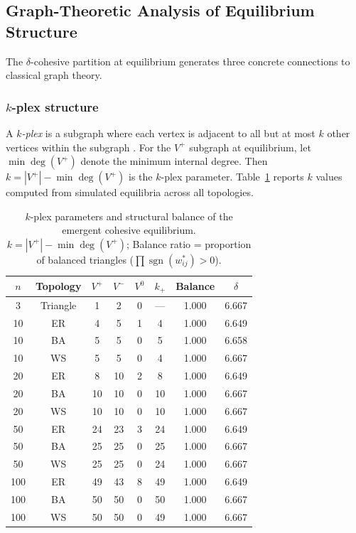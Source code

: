 \documentclass[3p]{elsarticle}
\DeclareMathOperator{\sign}{sgn}
\begin{document}
\subsection{Graph-Theoretic Analysis of Equilibrium Structure}

The $\delta$-cohesive partition at equilibrium generates three concrete connections to classical graph theory.

\subsubsection{$k$-plex structure}

A \emph{$k$-plex} is a subgraph where each vertex is adjacent to all but at most $k$ other vertices within the subgraph \cite{seidman1983network}. For the $V^+$ subgraph at equilibrium, let $\min\deg(V^+)$ denote the minimum internal degree. Then $k = |V^+| - \min\deg(V^+)$ is the $k$-plex parameter. Table~\ref{tab:kplex} reports $k$ values computed from simulated equilibria across all topologies.

\begin{table}[ht]
\centering
\caption{$k$-plex parameters and structural balance of the emergent cohesive equilibrium. $k = |V^+| - \min\deg(V^+)$; Balance ratio = proportion of balanced triangles ($\prod \sign(w_{ij}^*) > 0$).}
\label{tab:kplex}
\begin{tabular}{cccccccc}
\toprule
$n$ & Topology & $V^+$ & $V^-$ & $V^0$ & $k_{+}$ & Balance & $\delta$\\
\midrule
3  & Triangle & 1 & 2 & 0 & --- & 1.000 & 6.667\\
10 & ER & 4 & 5 & 1 & 4 & 1.000 & 6.649\\
10 & BA & 5 & 5 & 0 & 5 & 1.000 & 6.658\\
10 & WS & 5 & 5 & 0 & 4 & 1.000 & 6.667\\
20 & ER & 8 & 10 & 2 & 8 & 1.000 & 6.649\\
20 & BA & 10 & 10 & 0 & 10 & 1.000 & 6.667\\
20 & WS & 10 & 10 & 0 & 10 & 1.000 & 6.667\\
50 & ER & 24 & 23 & 3 & 24 & 1.000 & 6.649\\
50 & BA & 25 & 25 & 0 & 25 & 1.000 & 6.667\\
50 & WS & 25 & 25 & 0 & 24 & 1.000 & 6.667\\
100 & ER & 49 & 43 & 8 & 49 & 1.000 & 6.649\\
100 & BA & 50 & 50 & 0 & 50 & 1.000 & 6.667\\
100 & WS & 50 & 50 & 0 & 49 & 1.000 & 6.667\\
\bottomrule
\end{tabular}
\end{table}
\end{document}
